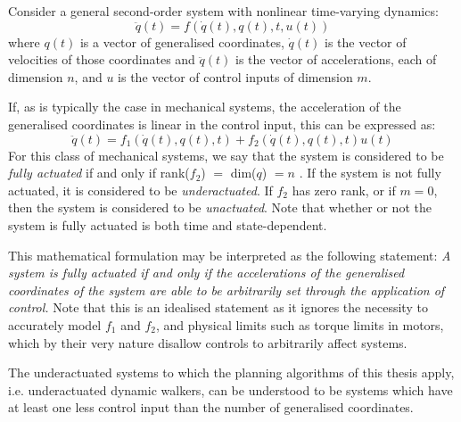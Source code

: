 Consider a general second-order system with nonlinear time-varying dynamics:
\[ \ddot{q}(t) = f\left(\dot{q}(t), q(t), t, u(t)\right) \]
where $q(t)$ is a vector of generalised coordinates, $\dot{q}(t)$ is the vector of velocities of those coordinates and $\ddot{q}(t)$ is the vector of accelerations, each of dimension $n$, and $u$ is the vector of control inputs of dimension $m$. 

If, as is typically the case in mechanical systems, the acceleration of the generalised coordinates is linear in the control input, this can be expressed as:
\[ \ddot{q}(t) = f_1\left(\dot{q}(t), q(t), t\right) + f_2\left(\dot{q}(t), q(t), t\right)u(t) \]
For this class of mechanical systems, we say that the system is considered to be \textit{fully actuated} if and only if rank($f_2$) $=$ dim($q$) $= n$ \cite{tedrake2009opencourseware}. If the system is not fully actuated, it is considered to be \textit{underactuated}. If $f_2$ has zero rank, or if $m=0$, then the system is considered to be \textit{unactuated}. Note that whether or not the system is fully actuated is both time and state-dependent.  

This mathematical formulation may be interpreted as the following statement:
\textit{A system is fully actuated if and only if the accelerations of the generalised coordinates of the system are able to be arbitrarily set through the application of control.} Note that this is an idealised statement as it ignores the necessity to accurately model $f_1$ and $f_2$, and physical limits such as torque limits in motors, which by their very nature disallow controls to arbitrarily affect systems. 

The underactuated systems to which the planning algorithms of this thesis apply, i.e. underactuated dynamic walkers, can be understood to be systems which have at least one less control input than the number of generalised coordinates.
